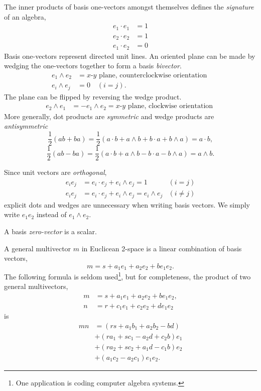 	The inner products of basis one-vectors amongst themselves defines the \emph{signature} of an algebra,	
	\begin{align*}
	e_1 \cdot e_1 & = 1\\
	e_2 \cdot e_2 & = 1\\	
	e_1 \cdot e_2 & = 0
	\end{align*}	
	Basis one-vectors represent directed unit lines. An oriented plane can be made by wedging the one-vectors together to form a basis \emph{bivector}.	
	\begin{align*}		
	e_1 \wedge e_2 & = x\text{-}y\text{ plane, counterclockwise orientation }\\
	e_i \wedge e_j & = 0 \quad \left(i = j\right).
	\end{align*}
	The plane can be flipped by reversing the wedge product.
	\begin{align*}		
	e_2 \wedge e_1 & = -e_1 \wedge e_2 = x\text{-}y\text{ plane, clockwise orientation }
	\end{align*}
	More generally, dot products are \emph{symmetric} and wedge products are \emph{antisymmetric}
	\[
	\frac{1}{2}\left( ab + ba\right)  = \frac{1}{2}\left( a \cdot b + a \wedge b + b \cdot a + b \wedge a\right)  = a \cdot b,
	\]
	\[
	\frac{1}{2}\left( ab - ba\right)  = \frac{1}{2}\left( a \cdot b + a \wedge b - b \cdot a - b \wedge a\right)  = a \wedge b.
	\]
	
	Since unit vectors are \emph{orthogonal},
	\begin{align*}
	e_ie_j & = e_i \cdot e_j + e_i \wedge e_j = 1 & \left( i = j\right) \\
	e_ie_j & = e_i \cdot e_j + e_i \wedge e_j = e_i \wedge e_j & \left( i \ne j\right) 
	\end{align*}
	explicit dots and wedges are unnecessary when writing basis vectors. We simply write $e_1e_2$ instead of $e_1 \wedge e_2$.
	
	A basis \emph{zero-vector} is a scalar.
	
	A general multivector $m$ in Euclicean 2-space is a linear combination of basis vectors,
	\[
	m = s + a_1e_1 + a_2e_2 + be_1e_2.
	\]
	The following formula is seldom used\footnote{One application is coding computer algebra systems.}, but for completeness, the product of two general multivectors,
	\begin{align*}
	m &= s + a_1e_1 + a_2e_2 + be_1e_2,\\
	n &= r + c_1e_1 + c_2e_2 + de_1e_2
	\end{align*}
	is
	\begin{align*}
	mn &= \left( rs + a_1b_1 + a_2b_2 - bd\right) \\
	&+ \left( ra_1 + sc_1 - a_2d + c_2b\right) e_1\\
	&+ \left( ra_2 + sc_2 + a_1d - c_1b\right) e_2\\
	&+ \left( a_1c_2 - a_2c_1\right) e_1e_2.
	\end{align*}
	
